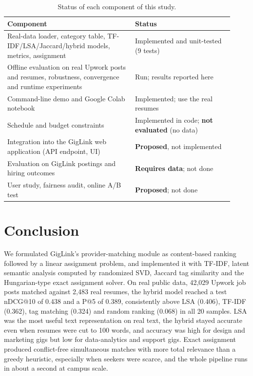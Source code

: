 \documentclass[12pt,a4paper]{article}
\numberwithin{equation}{section}
\theoremstyle{definition}
\theoremstyle{plain}
\begin{document}
\begin{table}[htbp]
\centering\small
\caption{Status of each component of this study.}\label{tab:status}
\begin{tabular}{>{\raggedright\arraybackslash}p{0.52\linewidth}>{\raggedright\arraybackslash}p{0.4\linewidth}}
\toprule
Component & Status \\
\midrule
Real-data loader, category table, TF-IDF/LSA/Jaccard/hybrid models, metrics, assignment & Implemented and unit-tested (9 tests) \\
Offline evaluation on real Upwork posts and resumes, robustness, convergence and runtime experiments & Run; results reported here \\
Command-line demo and Google Colab notebook & Implemented; use the real resumes \\
Schedule and budget constraints & Implemented in code; \textbf{not evaluated} (no data) \\
Integration into the GigLink web application (API endpoint, UI) & \textbf{Proposed}, not implemented \\
Evaluation on GigLink postings and hiring outcomes & \textbf{Requires data}; not done \\
User study, fairness audit, online A/B test & \textbf{Proposed}; not done \\
\bottomrule
\end{tabular}
\end{table}

\section{Conclusion}\label{sec:conclusion}
We formulated GigLink's provider-matching module as content-based ranking followed by a linear assignment problem, and implemented it with TF-IDF, latent semantic analysis computed by randomized SVD, Jaccard tag similarity and the Hungarian-type exact assignment solver. On real public data, 42,029 Upwork job posts matched against 2,483 real resumes, the hybrid model reached a test nDCG@10 of 0.438 and a P@5 of 0.389, consistently above LSA (0.406), TF-IDF (0.362), tag matching (0.324) and random ranking (0.068) in all 20 samples. LSA was the most useful text representation on real text, the hybrid stayed accurate even when resumes were cut to 100 words, and accuracy was high for design and marketing gigs but low for data-analytics and support gigs. Exact assignment produced conflict-free simultaneous matches with more total relevance than a greedy heuristic, especially when seekers were scarce, and the whole pipeline runs in about a second at campus scale.
\end{document}
